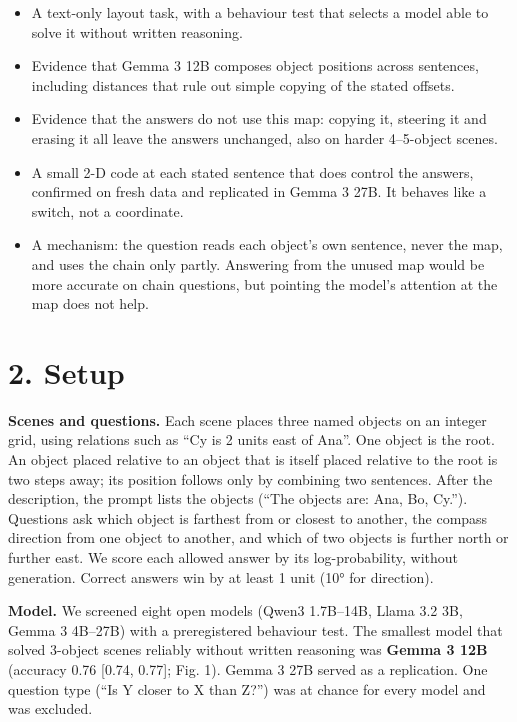 \documentclass[
  11pt,
]{article}
\providecommand{\tightlist}{%
  \setlength{\itemsep}{0pt}\setlength{\parskip}{0pt}}
\begin{document}
\begin{itemize}
\tightlist
\item
  A text-only layout task, with a behaviour test that selects a model
  able to solve it without written reasoning.
\item
  Evidence that Gemma 3 12B composes object positions across sentences,
  including distances that rule out simple copying of the stated
  offsets.
\item
  Evidence that the answers do not use this map: copying it, steering it
  and erasing it all leave the answers unchanged, also on harder
  4--5-object scenes.
\item
  A small 2-D code at each stated sentence that does control the
  answers, confirmed on fresh data and replicated in Gemma 3 27B. It
  behaves like a switch, not a coordinate.
\item
  A mechanism: the question reads each object's own sentence, never the
  map, and uses the chain only partly. Answering from the unused map
  would be more accurate on chain questions, but pointing the model's
  attention at the map does not help.
\end{itemize}

\section{2. Setup}\label{setup}

\textbf{Scenes and questions.} Each scene places three named objects on
an integer grid, using relations such as ``Cy is 2 units east of Ana''.
One object is the root. An object placed relative to an object that is
itself placed relative to the root is two steps away; its position
follows only by combining two sentences. After the description, the
prompt lists the objects (``The objects are: Ana, Bo, Cy.''). Questions
ask which object is farthest from or closest to another, the compass
direction from one object to another, and which of two objects is
further north or further east. We score each allowed answer by its
log-probability, without generation. Correct answers win by at least 1
unit (10° for direction).

\textbf{Model.} We screened eight open models (Qwen3 1.7B--14B, Llama
3.2 3B, Gemma 3 4B--27B) with a preregistered behaviour test. The
smallest model that solved 3-object scenes reliably without written
reasoning was \textbf{Gemma 3 12B} (accuracy 0.76 {[}0.74, 0.77{]}; Fig.
1). Gemma 3 27B served as a replication. One question type (``Is Y
closer to X than Z?'') was at chance for every model and was excluded.
\end{document}
